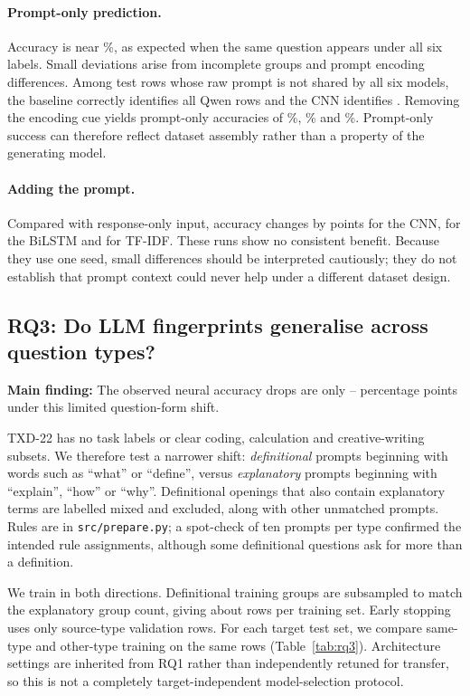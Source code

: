 \documentclass[11pt]{article}
\begin{document}
\paragraph{Prompt-only prediction.} Accuracy is near \ChancePct\%, as expected when the same question
appears under all six labels. Small deviations arise from incomplete groups and prompt encoding differences.
Among \RqTwoNotSharedN{} test rows whose raw prompt is not shared by all six models, the baseline correctly
identifies all \RqTwoNotSharedQwen{} Qwen rows and the CNN identifies
\RqTwoCnnNotSharedQwenCorrect{}. Removing the encoding cue yields prompt-only accuracies of
\RqTwoCnnInAsciiAcc\%, \RqTwoLstmInAsciiAcc\% and \RqTwoBaseInAsciiAcc\%. Prompt-only success can therefore
reflect dataset assembly rather than a property of the generating model.

\paragraph{Adding the prompt.} Compared with response-only input, accuracy changes by
\RqTwoCnnBothMinusOut{} points for the CNN, \RqTwoLstmBothMinusOut{} for the BiLSTM and
\RqTwoBaseBothMinusOut{} for TF-IDF. These runs show no consistent benefit. Because they use one seed,
small differences should be interpreted cautiously; they do not establish that prompt context could never
help under a different dataset design.

\subsection{RQ3: Do LLM fingerprints generalise across question types?}
\label{sec:rq3}
\noindent\textbf{Main finding:} The observed neural accuracy drops are only \RqThreeMinDropNeural{}--\RqThreeMaxDropNeural{}
percentage points under this limited question-form shift.

TXD-22 has no task labels or clear coding, calculation and creative-writing subsets. We therefore test
a narrower shift: \emph{definitional} prompts beginning with words such as ``what'' or ``define'', versus
\emph{explanatory} prompts beginning with ``explain'', ``how'' or ``why''. Definitional openings that also
contain explanatory terms are labelled mixed and excluded, along with other unmatched prompts.
Rules are in \texttt{src/prepare.py}; a spot-check of ten prompts per type confirmed the intended rule
assignments, although some definitional questions ask for more than a definition.

We train in both directions. Definitional training groups are subsampled to match the explanatory group
count, giving about \RqThreeMatchedTrainRows{} rows per training set. Early stopping uses only source-type
validation rows. For each target test set, we compare same-type and other-type training on the same rows
(Table~\ref{tab:rq3}). Architecture settings are inherited from RQ1 rather than independently retuned for
transfer, so this is not a completely target-independent model-selection protocol.
\end{document}
